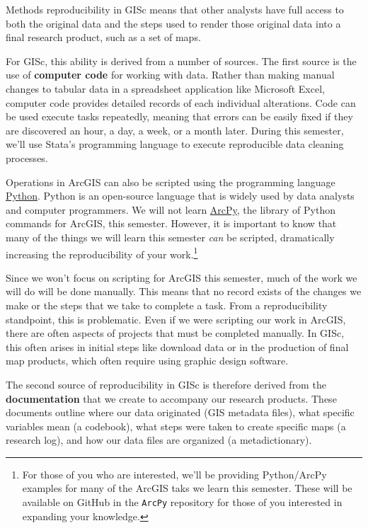 \documentclass[]{book}
\let\rmarkdownfootnote\footnote%
\def\footnote{\protect\rmarkdownfootnote}
\begin{document}
Methods reproducibility in GISc means that other analysts have full
access to both the original data and the steps used to render those
original data into a final research product, such as a set of maps.

For GISc, this ability is derived from a number of sources. The first
source is the use of \textbf{computer code} for working with data.
Rather than making manual changes to tabular data in a spreadsheet
application like Microsoft Excel, computer code provides detailed
records of each individual alterations. Code can be used execute tasks
repeatedly, meaning that errors can be easily fixed if they are
discovered an hour, a day, a week, or a month later. During this
semester, we'll use Stata's programming language to execute reproducible
data cleaning processes.

Operations in ArcGIS can also be scripted using the programming language
\href{https://www.python.org}{Python}. Python is an open-source language
that is widely used by data analysts and computer programmers. We will
not learn
\href{http://pro.arcgis.com/en/pro-app/arcpy/get-started/what-is-arcpy-.htm}{ArcPy},
the library of Python commands for ArcGIS, this semester. However, it is
important to know that many of the things we will learn this semester
\emph{can} be scripted, dramatically increasing the reproducibility of
your work.\footnote{For those of you who are interested, we'll be
  providing Python/ArcPy examples for many of the ArcGIS taks we learn
  this semester. These will be available on GitHub in the \texttt{ArcPy}
  repository for those of you interested in expanding your knowledge.}

Since we won't focus on scripting for ArcGIS this semester, much of the
work we will do will be done manually. This means that no record exists
of the changes we make or the steps that we take to complete a task.
From a reproducibility standpoint, this is problematic. Even if we were
scripting our work in ArcGIS, there are often aspects of projects that
must be completed manually. In GISc, this often arises in initial steps
like download data or in the production of final map products, which
often require using graphic design software.

The second source of reproducibility in GISc is therefore derived from
the \textbf{documentation} that we create to accompany our research
products. These documents outline where our data originated (GIS
metadata files), what specific variables mean (a codebook), what steps
were taken to create specific maps (a research log), and how our data
files are organized (a metadictionary).
\end{document}
